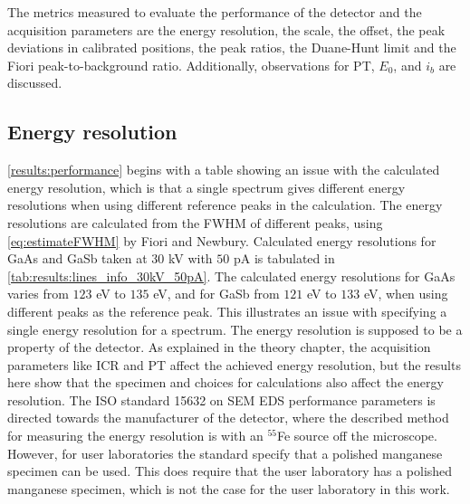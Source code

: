 The metrics measured to evaluate the performance of the detector and the acquisition parameters are the energy resolution, the scale, the offset, the peak deviations in calibrated positions, the peak ratios, the Duane-Hunt limit and the Fiori peak-to-background ratio.
Additionally, observations for PT, $E_0$, and $i_b$ are discussed.



\subsection{Energy resolution}
\label{discussion:energy_resolution}


\cref{results:performance} begins with a table showing an issue with the calculated energy resolution, which is that a single spectrum gives different energy resolutions when using different reference peaks in the calculation.
The energy resolutions are calculated from the FWHM of different peaks, using \cref{eq:estimateFWHM} by Fiori and Newbury.
Calculated energy resolutions for GaAs and GaSb taken at $30$ kV with $50$ pA is tabulated in \cref{tab:results:lines_info_30kV_50pA}.
The calculated energy resolutions for GaAs varies from $123$ eV to $135$ eV, and for GaSb from $121$ eV to $133$ eV,  when using different peaks as the reference peak.
This illustrates an issue with specifying a single energy resolution for a spectrum.
The energy resolution is supposed to be a property of the detector.
As explained in the theory chapter, the acquisition parameters like ICR and PT affect the achieved energy resolution, but the results here show that the specimen and choices for calculations also affect the energy resolution.
The ISO standard 15632 \cite{iso_qc_15632} on SEM EDS performance parameters is directed towards the manufacturer of the detector, where the described method for measuring the energy resolution is with an $^{55}$Fe source off the microscope.
However, for user laboratories the standard specify that a polished manganese specimen can be used.
This does require that the user laboratory has a polished manganese specimen, which is not the case for the user laboratory in this work.


